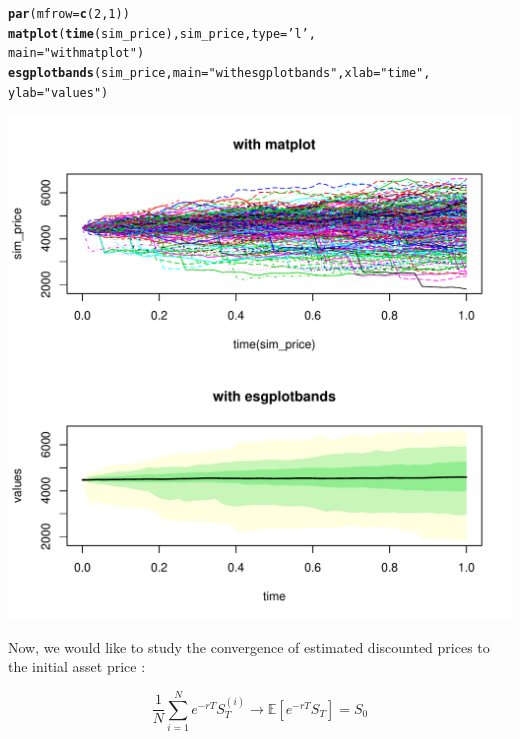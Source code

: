 \documentclass[a4paper]{article}\usepackage[]{graphicx}\usepackage[]{color}
\makeatletter
\def\maxwidth{ %
  \ifdim\Gin@nat@width>\linewidth
    \linewidth
  \else
    \Gin@nat@width
  \fi
}
\newcommand{\hlnum}[1]{\textcolor[rgb]{0.686,0.059,0.569}{#1}}%
\newcommand{\hlstr}[1]{\textcolor[rgb]{0.192,0.494,0.8}{#1}}%
\newcommand{\hlstd}[1]{\textcolor[rgb]{0.345,0.345,0.345}{#1}}%
\newcommand{\hlkwc}[1]{\textcolor[rgb]{0.333,0.667,0.333}{#1}}%
\newcommand{\hlkwd}[1]{\textcolor[rgb]{0.737,0.353,0.396}{\textbf{#1}}}%
\newenvironment{kframe}{%
 \def\at@end@of@kframe{}%
 \ifinner\ifhmode%
  \def\at@end@of@kframe{\end{minipage}}%
  \begin{minipage}{\columnwidth}%
 \fi\fi%
 \def\FrameCommand##1{\hskip\@totalleftmargin \hskip-\fboxsep
 \colorbox{shadecolor}{##1}\hskip-\fboxsep
     \hskip-\linewidth \hskip-\@totalleftmargin \hskip\columnwidth}%
 \MakeFramed {\advance\hsize-\width
   \@totalleftmargin\z@ \linewidth\hsize
   \@setminipage}}%
 {\par\unskip\endMakeFramed%
 \at@end@of@kframe}
\newenvironment{knitrout}{}{} %
\newcommand{\EE}{\ensuremath{\mathbb{E}} }
\makeatother
\begin{document}
\begin{knitrout}
\color{fgcolor}\begin{kframe}
\begin{alltt}
\hlkwd{par}\hlstd{(}\hlkwc{mfrow}\hlstd{=}\hlkwd{c}\hlstd{(}\hlnum{2}\hlstd{,} \hlnum{1}\hlstd{))}
\hlkwd{matplot}\hlstd{(}\hlkwd{time}\hlstd{(sim_price), sim_price,} \hlkwc{type} \hlstd{=} \hlstr{'l'}\hlstd{,}
        \hlkwc{main} \hlstd{=} \hlstr{"with matplot"}\hlstd{)}
\hlkwd{esgplotbands}\hlstd{(sim_price,} \hlkwc{main} \hlstd{=} \hlstr{"with esgplotbands"}\hlstd{,} \hlkwc{xlab} \hlstd{=} \hlstr{"time"}\hlstd{,}
             \hlkwc{ylab} \hlstd{=} \hlstr{"values"}\hlstd{)}
\end{alltt}
\end{kframe}
\includegraphics[width=\maxwidth]{figure/_example_SVJD_4-1} 

\end{knitrout}

Now, we would like to study the convergence of estimated discounted prices to the initial asset price : 

\begin{equation}
\frac{1}{N}\sum_{i = 1}^N e^{-rT} S_T^{(i)} \longrightarrow \EE[e^{-rT}S_T] = S_0
\end{equation}
\end{document}
